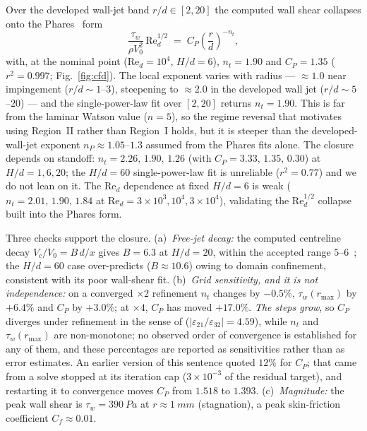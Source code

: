 \documentclass[aps,prfluids,reprint,amsmath,amssymb,floatfix]{revtex4-2}
\newcommand{\Rey}{\mathrm{Re}}
\begin{document}
Over the developed wall-jet band $r/d \in [2, 20]$ the computed wall shear
collapses onto the Phares~\citep{Phares2000} form
\begin{equation}
  \frac{\tau_w}{\rho V_0^2}\,\Rey_d^{1/2}
  \;=\; C_P\left(\frac{r}{d}\right)^{-n_t},
  \label{eq:cfdclosure}
\end{equation}
with, at the nominal point ($\Rey_d = 10^4$, $H/d = 6$), $n_t = 1.90$ and
$C_P = 1.35$ ($r^2 = 0.997$; Fig.~\ref{fig:cfd}). The local exponent varies
with radius --- $\approx 1.0$ near impingement ($r/d \sim 1$--$3$), steepening
to $\approx 2.0$ in the developed wall jet ($r/d \sim 5$--$20$) --- and the
single-power-law fit over $[2,20]$ returns $n_t = 1.90$. This is far from the
laminar Watson value ($n = 5$), so the regime reversal that motivates using
Region~II rather than Region~I holds, but it is steeper than the
developed-wall-jet exponent $n_P \approx 1.05$--$1.3$ assumed from the Phares
fits alone. The closure depends on standoff: $n_t = 2.26,\,1.90,\,1.26$ (with
$C_P = 3.33,\,1.35,\,0.30$) at $H/d = 1, 6, 20$; the $H/d = 60$
single-power-law fit is unreliable ($r^2 = 0.77$) and we do not lean on it.
The $\Rey_d$ dependence at fixed $H/d = 6$ is weak
($n_t = 2.01,\,1.90,\,1.84$ at $\Rey_d = 3\times 10^3, 10^4, 3\times 10^4$),
validating the $\Rey_d^{1/2}$ collapse built into the Phares form.

Three checks support the closure. (a)~\emph{Free-jet decay:} the computed
centreline decay $V_c/V_0 = B\,d/x$ gives $B = 6.3$ at $H/d = 20$, within the
accepted range $5$--$6$~\citep{HusseinCappGeorge1994}; the $H/d = 60$ case
over-predicts ($B \approx 10.6$) owing to domain confinement, consistent with
its poor wall-shear fit. (b)~\emph{Grid sensitivity, and it is not
independence:} on a converged $\times 2$ refinement $n_t$ changes by $-0.5\%$,
$\tau_w(r_\mathrm{max})$ by $+6.4\%$ and $C_P$ by $+3.0\%$; at $\times 4$,
$C_P$ has moved $+17.0\%$. \emph{The steps grow}, so $C_P$ diverges under
refinement in the sense of \citet{Celik2008}
($|\varepsilon_{21}/\varepsilon_{32}| = 4.59$), while $n_t$ and
$\tau_w(r_\mathrm{max})$ are non-monotone; no observed order of convergence is
established for any of them, and these percentages are reported as
sensitivities rather than as error estimates. An earlier version of this
sentence quoted $12\%$ for $C_P$; that came from a solve stopped at its
iteration cap ($3\times10^{-3}$ of the residual target), and restarting it to
convergence moves $C_P$ from $1.518$ to $1.393$. (c)~\emph{Magnitude:} the peak wall shear is
$\tau_w = \SI{390}{Pa}$ at $r \approx \SI{1}{mm}$ (stagnation), a peak
skin-friction coefficient $C_f \approx 0.01$.
\end{document}
